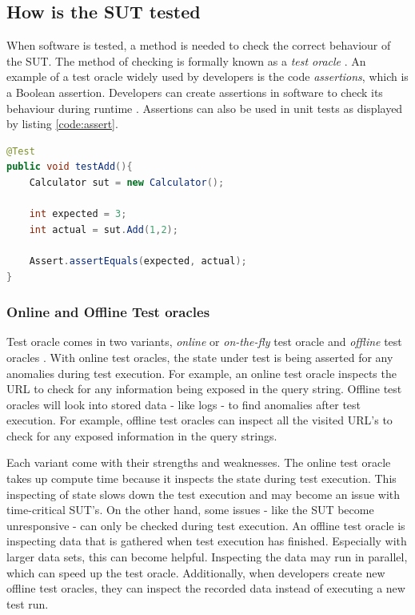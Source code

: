 \subsection{How is the SUT tested} \label{test-oracles}
When software is tested, a method is needed to check the correct behaviour of the SUT. The method of checking is formally known as a \emph{test oracle} \cite{testOracles}. An example of a test oracle widely used by developers is the code \emph{assertions}, which is a Boolean assertion. Developers can create assertions in software to check its behaviour during runtime \cite{barr2014oracle}. Assertions can also be used in unit tests as displayed by listing \ref{code:assert}. 

\begin{lstlisting}[language=Java, caption=Assertion, label=code:assert]
@Test
public void testAdd(){
    Calculator sut = new Calculator();

    int expected = 3;
    int actual = sut.Add(1,2);

    Assert.assertEquals(expected, actual);
}
\end{lstlisting}

\subsubsection{Online and Offline Test oracles}
Test oracle comes in two variants, \emph{online} or \emph{on-the-fly} test oracle and \emph{offline} test oracles \cite{VosAho2021}. With online test oracles, the state under test is being asserted for any anomalies during test execution. For example,  an online test oracle inspects the URL to check for any information being exposed in the query string. Offline test oracles will look into stored data - like logs - to find anomalies after test execution. For example, offline test oracles can inspect all the visited URL's to check for any exposed information in the query strings.

Each variant come with their strengths and weaknesses. The online test oracle takes up compute time because it inspects the state during test execution. This inspecting of state slows down the test execution and may become an issue with time-critical SUT's. On the other hand, some issues - like the SUT become unresponsive - can only be checked during test execution. An offline test oracle is inspecting data that is gathered when test execution has finished. Especially with larger data sets, this can become helpful. Inspecting the data may run in parallel, which can speed up the test oracle. Additionally, when developers create new offline test oracles, they can inspect the recorded data instead of executing a new test run. \cite{de2019offline}

